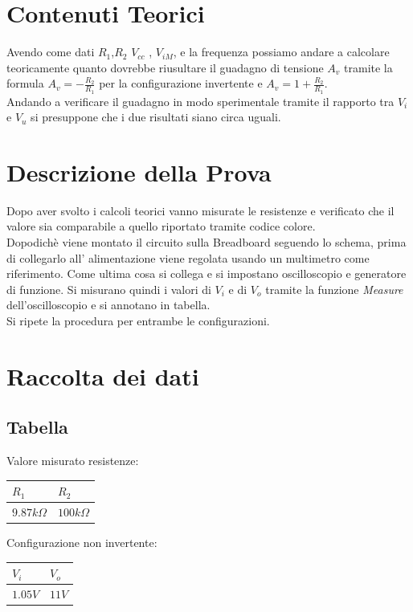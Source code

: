 \documentclass[12pt]{article}
\begin{document}
\section{Contenuti Teorici}
Avendo come dati $R_1$,$R_2$  $V_{cc}$ , $V_{iM}$, e la frequenza possiamo andare a calcolare
teoricamente quanto dovrebbe riusultare il guadagno di tensione $A_v$ tramite la formula
$A_v=-\frac{R_2}{R_1}$ per la configurazione invertente e $A_v=1+\frac{R_2}{R_1}$.\\
Andando a verificare il guadagno in modo sperimentale tramite il rapporto tra $V_i$ e $V_u$
si presuppone che i due risultati siano circa uguali.\\
\section{Descrizione della Prova}
Dopo aver svolto i calcoli teorici vanno misurate le resistenze e verificato che il valore sia 
comparabile a quello riportato tramite codice colore.\\
Dopodichè viene montato il circuito sulla Breadboard seguendo lo schema, prima di collegarlo all'
alimentazione viene regolata usando un multimetro come riferimento.
Come ultima cosa si collega e si impostano oscilloscopio e generatore di funzione.
Si misurano quindi i valori di $V_i$ e di $V_o$ tramite la funzione \textit{Measure} dell'oscilloscopio
e si annotano in tabella.\\
Si ripete la procedura per entrambe le configurazioni.\\
\section{Raccolta dei dati}

\subsection{Tabella}
Valore misurato resistenze:\\
\begin{center}
        \begin{tabular}{|p{2cm}|p{2cm}|}
            \hline
            \rowcolor{RoyalBlue} $R_1$ & $R_2$ \\
            \hline
            \rowcolor{CornflowerBlue} $9.87k\Omega$ & $100k\Omega$  \\ 
            \hline
        \end{tabular}
        \label{Valore resistenze}
\end{center}
\noindent
Configurazione non invertente:\\
\begin{center}
    \begin{tabular}{|p{2cm} |p{2cm}|}
        \hline
        \rowcolor{RoyalBlue} $V_i$ & $V_o$  \\
        \hline
        \rowcolor{CornflowerBlue} $1.05V$ & $11V$  \\ 
        \hline
    \end{tabular}
    \label{Valore resistenze}
\end{center}
\end{document}
